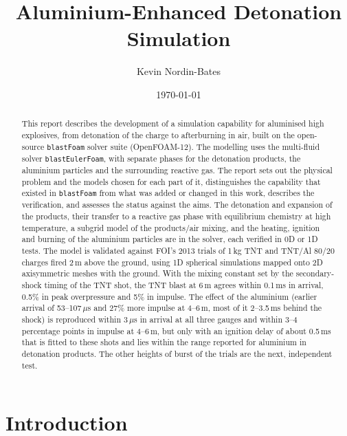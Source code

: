 \documentclass{article}
\title{\textbf{Aluminium-Enhanced Detonation Simulation}}
\author{Kevin Nordin-Bates}
\date{\today}
\begin{document}
\maketitle

\begin{abstract}
This report describes the development of a simulation capability for aluminised high explosives, from detonation of the charge to afterburning in air, built on the open-source \texttt{blastFoam} solver suite (OpenFOAM-12). The modelling uses the multi-fluid solver \texttt{blastEulerFoam}, with separate phases for the detonation products, the aluminium particles and the surrounding reactive gas. The report sets out the physical problem and the models chosen for each part of it, distinguishes the capability that existed in \texttt{blastFoam} from what was added or changed in this work, describes the verification, and assesses the status against the aims. The detonation and expansion of the products, their transfer to a reactive gas phase with equilibrium chemistry at high temperature, a subgrid model of the products/air mixing, and the heating, ignition and burning of the aluminium particles are in the solver, each verified in 0D or 1D tests. The model is validated against FOI's 2013 trials of 1\,kg TNT and TNT/Al 80/20 charges fired 2\,m above the ground, using 1D spherical simulations mapped onto 2D axisymmetric meshes with the ground. With the mixing constant set by the secondary-shock timing of the TNT shot, the TNT blast at 6\,m agrees within 0.1\,ms in arrival, 0.5\% in peak overpressure and 5\% in impulse. The effect of the aluminium (earlier arrival of 53--107\,$\mu$s and 27\% more impulse at 4--6\,m, most of it 2--3.5\,ms behind the shock) is reproduced within 3\,$\mu$s in arrival at all three gauges and within 3--4 percentage points in impulse at 4--6\,m, but only with an ignition delay of about 0.5\,ms that is fitted to these shots and lies within the range reported for aluminium in detonation products. The other heights of burst of the trials are the next, independent test.
\end{abstract}

\tableofcontents

\section{Introduction}
\label{sec:intro}
\end{document}
